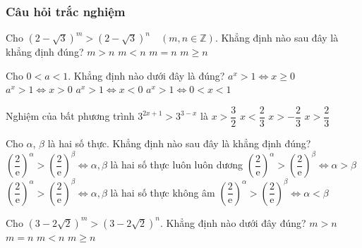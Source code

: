 \subsubsection{Câu hỏi trắc nghiệm}
\begin{ex}%
	Cho $(2-\sqrt{3})^m>(2-\sqrt{3})^n\quad(m,n\in\mathbb{Z})$. Khẳng định nào sau đây là khẳng định đúng?
	\choice
	{$m>n$}
	{\True $m<n$}
	{$m=n$}
	{$m\geq n$}
\end{ex}
\begin{ex}%
	Cho $0<a<1$. Khẳng định nào dưới đây là đúng?
	\choice
	{$a^x>1\Leftrightarrow x\geq 0$}
	{$a^x>1\Leftrightarrow x>0$}
	{\True $a^x>1\Leftrightarrow x<0$}
	{$a^x>1\Leftrightarrow 0<x<1$}
\end{ex}
\begin{ex}%
	Nghiệm của bất phương trình $3^{2x+1}>3^{3-x}$ là 
	\choice
	{$x>\dfrac{3}{2}$}
	{$x<\dfrac{2}{3}$}
	{$x >-\dfrac{2}{3}$}
	{\True $x>\dfrac{2}{3}$}
\end{ex}
\begin{ex}%
	Cho $\alpha$, $\beta$ là hai số thực. Khẳng định nào sau đây là khẳng định đúng?
	\choice
	{$\left(\dfrac{2}{\mathrm{e}}\right)^{\alpha}>\left(\dfrac{2}{\mathrm{e}}\right)^{\beta}\Leftrightarrow\alpha,\beta$ là hai số thực luôn luôn dương}
	{$\left(\dfrac{2}{\mathrm{e}}\right)^{\alpha}>\left(\dfrac{2}{\mathrm{e}}\right)^{\beta}\Leftrightarrow\alpha>\beta$}
	{$\left(\dfrac{2}{\mathrm{e}}\right)^{\alpha}>\left(\dfrac{2}{\mathrm{e}}\right)^{\beta}\Leftrightarrow\alpha,\beta$ là hai số thực không âm}
	{\True $\left(\dfrac{2}{\mathrm{e}}\right)^{\alpha}>\left(\dfrac{2}{\mathrm{e}}\right)^{\beta}\Leftrightarrow\alpha<\beta$}
\end{ex}
\begin{ex}%
	Cho $\left(3-2\sqrt{2}\right)^m>\left(3-2\sqrt{2}\right)^n$. Khẳng định nào dưới đây đúng?
	\choice
	{$m>n$}
	{$m=n$}
	{\True $m<n$}
	{$m\geq n$}
\end{ex}
